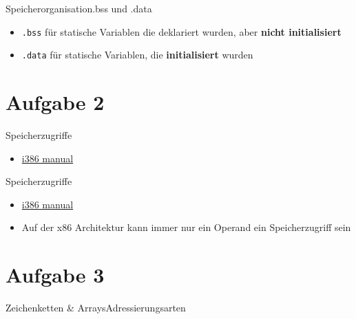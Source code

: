 \documentclass[
  german,            %
  aspectratio=169,    %
  sectionpage=false,   %
]{tumbeamer}
\begin{document}
\begin{frame}{Speicherorganisation}{.bss und .data}
	\begin{itemize}
		\item \texttt{.bss} für statische Variablen die deklariert wurden, aber \textbf{nicht initialisiert}
		\item \texttt{.data} für statische Variablen, die \textbf{initialisiert} wurden
	\end{itemize}
\end{frame}
\section{Aufgabe 2}
\begin{frame}{Speicherzugriffe}
	\begin{itemize}
		\item \href{https://css.csail.mit.edu/6.858/2015/readings/i386.pdf}{i386 manual}
	\end{itemize}
\end{frame}
\begin{frame}{Speicherzugriffe}
	\begin{itemize}
		\item \href{https://css.csail.mit.edu/6.858/2015/readings/i386.pdf}{i386 manual}
		\item Auf der x86 Architektur kann immer nur ein Operand ein Speicherzugriff sein
	\end{itemize}
\end{frame}
\section{Aufgabe 3}
\begin{frame}{Zeichenketten \& Arrays}{Adressierungsarten}
\end{frame}
\end{document}
